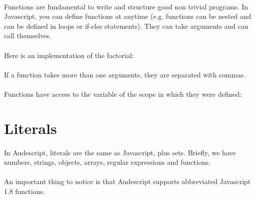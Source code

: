 \documentclass{article}
\begin{document}
\begin{sloppypar}
\paragraph{}
Functions are fundamental to write and structure good non trivial programs. In Javascript, you can define functions at anytime (e.g. functions can be nested and can be defined in loops or if-else statements). They can take arguments and can call themselves.
   
   
\paragraph{}
Here is an implementation of the factorial:
   {}

   
\paragraph{}
If a function takes more than one arguments, they are separated with commas.

   {}

   
\paragraph{}
Functions have access to the variable of the scope in which they were defined:
   
   {}




\section{ Literals}


\paragraph{}
In Audescript, literals are the same as Javascript, plus sets.
   Briefly, we have numbers, strings, objects, arrays, regular expressions and functions.

   
\paragraph{}
An important thing to notice is that Audescript supports abbreviated Javascript 1.8 functions.
   


\end{sloppypar}
\end{document}

